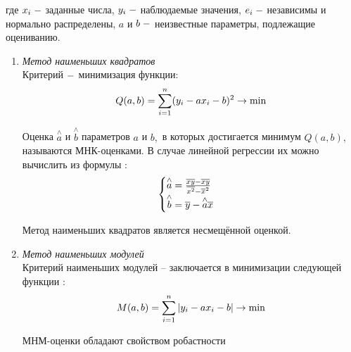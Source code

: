 \documentclass[a4]{article}
\begin{document}
	где $x_i\;\--$ заданные числа, $y_i\;\--$ наблюдаемые значения, $e_i\;\--$ независимы и нормально распределены, $a$ и $b\;\--$ неизвестные параметры, подлежащие оцениванию.

	\begin{enumerate}
	\item \textit{Метод наименьших квадратов}\\
	Критерий $\--$ минимизация функции:
	\begin{equation}
	    Q(a,b)=\sum\limits_{i=1}^n(y_i-ax_i-b)^2\to \min\hfill
	\end{equation}

	Оценка $\overset{\wedge}{a}$ и $\overset{\wedge}{b}$ параметров $a$ и $b,$ в которых достигается минимум $Q(a,b),$ называются МНК-оценками. В случае линейной регрессии их можно вычислить из формулы :
	\begin{equation}
	    \begin{cases}
	    \overset{\wedge}{a} = \frac{\overline{x y}-\overline{x}\overline{y}}{\overline{x^2}-\overline{x}^2}\\
	    \overset{\wedge}{b} = \overline{y}-\overset{\wedge}{a}\overline{x}
	    \end{cases}\hfill
	\end{equation}

	Метод наименьших квадратов является несмещённой оценкой.


	\item \textit{Метод наименьших модулей}\\
	Критерий наименьших модулей – заключается в минимизации следующей функции :
	\begin{equation}
	    M(a,b) = \sum\limits_{i=1}^n\vert y_i-ax_i-b\vert\to\min\hfill
	\end{equation}

	МНМ-оценки обладают свойством робастности
	\end{enumerate}
\end{document}

